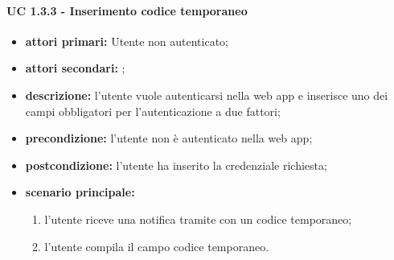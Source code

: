 			\paragraph{UC 1.3.3 - Inserimento codice temporaneo}
			\begin{itemize}
				\item \textbf{attori primari:} Utente non autenticato;
				\item \textbf{attori secondari:} ;
				\item \textbf{descrizione:} l'utente vuole autenticarsi nella web app e inserisce uno dei campi obbligatori per l'autenticazione a due fattori;
				\item \textbf{precondizione:} l'utente non è autenticato nella web app;
				\item \textbf{postcondizione:} l'utente ha inserito la credenziale richiesta;
				\item \textbf{scenario principale:}
				\begin{enumerate}
					\item l'utente riceve una notifica tramite  con un codice temporaneo;
					\item l'utente compila il campo codice temporaneo.
				\end{enumerate}	
			\end{itemize}

